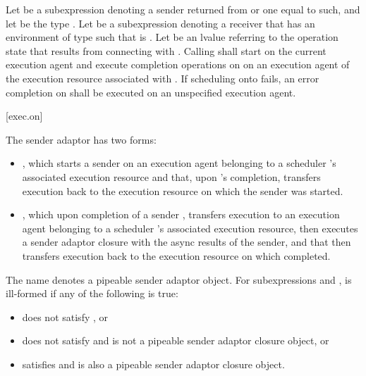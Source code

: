 \pnum
Let  be a subexpression denoting
a sender returned from  or one equal to such,
and let  be the type .
Let  be a subexpression denoting a receiver
that has an environment of type 
such that  is .
Let  be an lvalue referring to the operation state
that results from connecting  with .
Calling  shall
start  on the current execution agent and
execute completion operations on 
on an execution agent of the execution resource associated with .
If scheduling onto  fails,
an error completion on  shall be executed
on an unspecified execution agent.

[exec.on]{}

\pnum
The  sender adaptor has two forms:
\begin{itemize}
\item
{},
which starts a sender  on an execution agent
belonging to a scheduler 's associated execution resource and
that, upon 's completion,
transfers execution back to the execution resource
on which the  sender was started.
\item
{},
which upon completion of a sender ,
transfers execution to an execution agent
belonging to a scheduler 's associated execution resource,
then executes a sender adaptor closure 
with the async results of the sender, and
that then transfers execution back to the execution resource
on which  completed.
\end{itemize}

\pnum
The name  denotes a pipeable sender adaptor object.
For subexpressions  and ,
 is ill-formed if any of the following is true:
\begin{itemize}
\item
{} does not satisfy , or
\item
{} does not satisfy  and
 is not
a pipeable sender adaptor closure object, or
\item
{} satisfies  and
is also a pipeable sender adaptor closure object.
\end{itemize}


